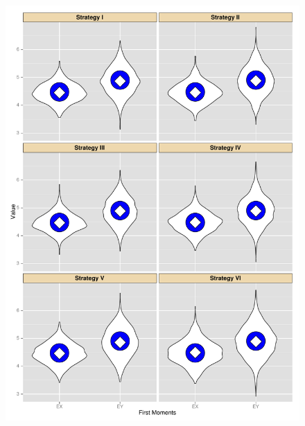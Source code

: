 \begin{figure}
	\begin{minipage}[b]{.5\linewidth}
		\centering \includegraphics[width=\textwidth,keepaspectratio=TRUE]{./img/firstMomentsBaragatti.pdf}
		\label{firstMomentsBaragatti}
	\end{minipage}%
	\begin{minipage}[b]{.5\linewidth}

\end{minipage}
\end{figure}
